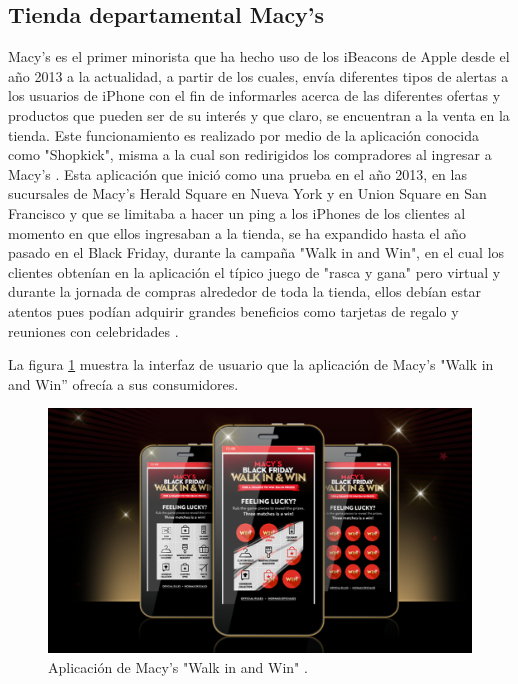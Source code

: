 \subsection{Tienda departamental Macy's}
Macy's es el primer minorista que ha hecho uso de los iBeacons de Apple desde el año 2013 a la actualidad, a partir de los cuales, envía diferentes tipos de alertas a los usuarios de iPhone con el fin de informarles acerca de las diferentes ofertas y productos que pueden ser de su interés y que claro, se encuentran a la venta en la tienda.
Este funcionamiento es realizado por medio de la aplicación conocida como "Shopkick", misma a la cual son redirigidos los compradores al ingresar a Macy's \cite{MACY'S1}. Esta aplicación que inició como una prueba en el año 2013, en las sucursales de Macy's Herald Square en Nueva York y en Union Square en San Francisco y  que se limitaba a hacer un ping a los iPhones de los clientes al momento en que ellos ingresaban a la tienda, se ha expandido hasta el año pasado en el Black Friday, durante la campaña "Walk in and Win", en el cual los clientes obtenían en la aplicación el típico juego de "rasca y gana" pero virtual y durante la jornada de compras alrededor de toda la tienda, ellos debían estar atentos pues podían adquirir grandes beneficios como tarjetas de regalo y reuniones con celebridades \cite{MACY'S2}.
\\ \par
La figura \ref{image:macysapp} muestra la interfaz de usuario que la aplicación de Macy's "Walk in and Win'' ofrecía a sus consumidores.
\FloatBarrier
\begin{figure}[htbp!]
		\centering
			\includegraphics[width=.45 \textwidth]{imagenes/walkinandwin}
		\caption{Aplicación de Macy's "Walk in and Win"  \cite{MACY'S3}.}
		\label{image:macysapp}
\end{figure}
\FloatBarrier

